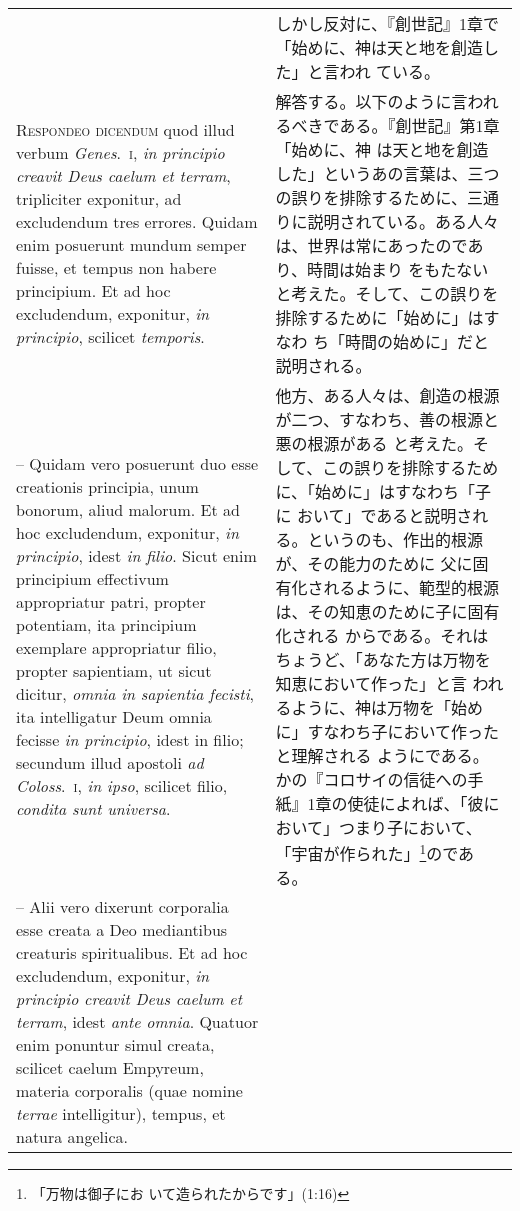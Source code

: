 \documentclass[10pt]{jsarticle} %
\begin{document}
\begin{longtable}{p{21em}p{21em}}
&

しかし反対に、『創世記』1章で「始めに、神は天と地を創造した」と言われ
ている。

\\


{\scshape Respondeo dicendum} quod illud verbum {\itshape
Genes}.~{\scshape i}, {\itshape in principio creavit Deus caelum et
terram}, tripliciter exponitur, ad excludendum tres errores. Quidam enim
posuerunt mundum semper fuisse, et tempus non habere principium. Et ad
hoc excludendum, exponitur, {\itshape in principio}, scilicet {\itshape
temporis}.


&

解答する。以下のように言われるべきである。『創世記』第1章「始めに、神
は天と地を創造した」というあの言葉は、三つの誤りを排除するために、三通
りに説明されている。ある人々は、世界は常にあったのであり、時間は始まり
をもたないと考えた。そして、この誤りを排除するために「始めに」はすなわ
ち「時間の始めに」だと説明される。

\\



-- Quidam vero posuerunt duo esse creationis principia, unum bonorum,
aliud malorum. Et ad hoc excludendum, exponitur, {\itshape in
principio}, idest {\itshape in filio}. Sicut enim principium effectivum
appropriatur patri, propter potentiam, ita principium exemplare
appropriatur filio, propter sapientiam, ut sicut dicitur, {\itshape
omnia in sapientia fecisti}, ita intelligatur Deum omnia fecisse
{\itshape in principio}, idest in filio; secundum illud apostoli
{\itshape ad Coloss}.~{\scshape i}, {\itshape in ipso}, scilicet filio,
{\itshape condita sunt universa}.

&

他方、ある人々は、創造の根源が二つ、すなわち、善の根源と悪の根源がある
と考えた。そして、この誤りを排除するために、「始めに」はすなわち「子に
おいて」であると説明される。というのも、作出的根源が、その能力のために
父に固有化されるように、範型的根源は、その知恵のために子に固有化される
からである。それはちょうど、「あなた方は万物を知恵において作った」と言
われるように、神は万物を「始めに」すなわち子において作ったと理解される
ようにである。かの『コロサイの信徒への手紙』1章の使徒によれば、「彼に
おいて」つまり子において、「宇宙が作られた」\footnote{「万物は御子にお
いて造られたからです」(1:16)}のである。

\\


-- Alii vero dixerunt corporalia esse creata a Deo mediantibus creaturis
spiritualibus. Et ad hoc excludendum, exponitur, {\itshape in principio
creavit Deus caelum et terram}, idest {\itshape ante omnia}. Quatuor
enim ponuntur simul creata, scilicet caelum Empyreum, materia corporalis
(quae nomine {\itshape terrae} intelligitur), tempus, et natura angelica.


\end{longtable}
\end{document}
